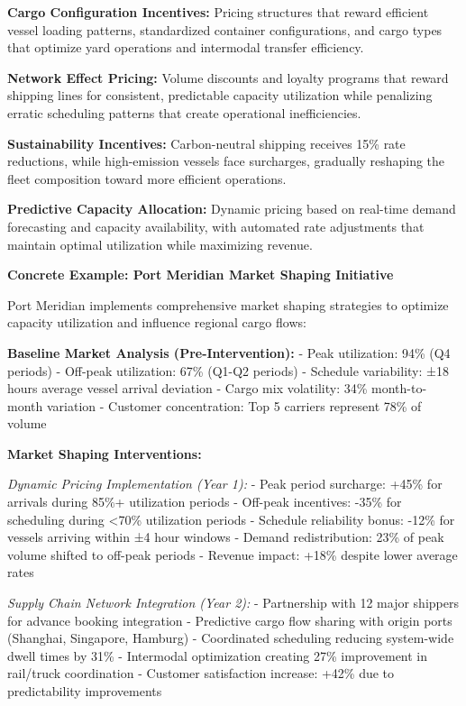 \documentclass{article}
\begin{document}
\textbf{Cargo Configuration Incentives:} Pricing structures that reward efficient vessel loading patterns, standardized container configurations, and cargo types that optimize yard operations and intermodal transfer efficiency.

\textbf{Network Effect Pricing:} Volume discounts and loyalty programs that reward shipping lines for consistent, predictable capacity utilization while penalizing erratic scheduling patterns that create operational inefficiencies.

\textbf{Sustainability Incentives:} Carbon-neutral shipping receives 15\% rate reductions, while high-emission vessels face surcharges, gradually reshaping the fleet composition toward more efficient operations.

\textbf{Predictive Capacity Allocation:} Dynamic pricing based on real-time demand forecasting and capacity availability, with automated rate adjustments that maintain optimal utilization while maximizing revenue.

\textbf{Concrete Example: Port Meridian Market Shaping Initiative}

Port Meridian implements comprehensive market shaping strategies to optimize capacity utilization and influence regional cargo flows:

\textbf{Baseline Market Analysis (Pre-Intervention):}
- Peak utilization: 94\% (Q4 periods)
- Off-peak utilization: 67\% (Q1-Q2 periods)  
- Schedule variability: ±18 hours average vessel arrival deviation
- Cargo mix volatility: 34\% month-to-month variation
- Customer concentration: Top 5 carriers represent 78\% of volume

\textbf{Market Shaping Interventions:}

\textit{Dynamic Pricing Implementation (Year 1):}
- Peak period surcharge: +45\% for arrivals during 85\%+ utilization periods
- Off-peak incentives: -35\% for scheduling during <70\% utilization periods
- Schedule reliability bonus: -12\% for vessels arriving within ±4 hour windows
- Demand redistribution: 23\% of peak volume shifted to off-peak periods
- Revenue impact: +18\% despite lower average rates

\textit{Supply Chain Network Integration (Year 2):}
- Partnership with 12 major shippers for advance booking integration
- Predictive cargo flow sharing with origin ports (Shanghai, Singapore, Hamburg)
- Coordinated scheduling reducing system-wide dwell times by 31\%
- Intermodal optimization creating 27\% improvement in rail/truck coordination
- Customer satisfaction increase: +42\% due to predictability improvements
\end{document}
